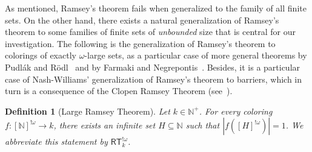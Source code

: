 \documentclass[10pt,a4paper]{article}
\newcommand{\RT}[0]{\mathsf{RT}}
\newcommand{\NN}[0]{\mathbb{N}}
\numberwithin{theorem}{section}
\newtheorem{definition}[theorem]{Definition}
\begin{document}
As mentioned, Ramsey's theorem fails when generalized to the family of all finite sets. On the other hand, there exists a natural generalization of Ramsey's theorem to some families of finite sets of {\em unbounded} size that is central for our investigation. The following is the generalization of Ramsey's theorem to colorings of exactly $\omega$-large sets, as a particular case of more general theorems by Pudl\'ak and R\"{o}dl~\cite{Pud-Rod:82} and by Farmaki and Negrepontis~\cite{Far-Neg:08}. 
Besides, it is a particular case of Nash-Williams' generalization of Ramsey's theorem to barriers, which in turn is a consequence of the Clopen Ramsey Theorem (see~\cite{SIM:SOSOA}). 






\begin{definition}[Large Ramsey Theorem]\label{def:largeRT} Let $k\in \NN^+$. 
For every coloring $f:[\NN]^{!\omega} \to k$, there exists an infinite set $H \subseteq \NN$ such that $|f([H]^{!\omega})| = 1$. We abbreviate this statement by  $\RT^{!\omega}_k$.
\end{definition}
\end{document}
